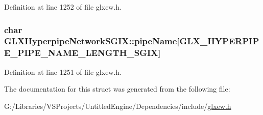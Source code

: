 Definition at line 1252 of file glxew.\+h.

\hypertarget{struct_g_l_x_hyperpipe_network_s_g_i_x_a6338b9717fa895aec16b932f2ef693ed}{}
\subsubsection[{pipe\+Name}]{\setlength{\rightskip}{0pt plus 5cm}char G\+L\+X\+Hyperpipe\+Network\+S\+G\+I\+X\+::pipe\+Name\mbox{[}{\bf G\+L\+X\+\_\+\+H\+Y\+P\+E\+R\+P\+I\+P\+E\+\_\+\+P\+I\+P\+E\+\_\+\+N\+A\+M\+E\+\_\+\+L\+E\+N\+G\+T\+H\+\_\+\+S\+G\+I\+X}\mbox{]}}\label{struct_g_l_x_hyperpipe_network_s_g_i_x_a6338b9717fa895aec16b932f2ef693ed}


Definition at line 1251 of file glxew.\+h.



The documentation for this struct was generated from the following file\+:\begin{DoxyCompactItemize}
\item 
G\+:/\+Libraries/\+V\+S\+Projects/\+Untitled\+Engine/\+Dependencies/include/\hyperlink{glxew_8h}{glxew.\+h}\end{DoxyCompactItemize}
